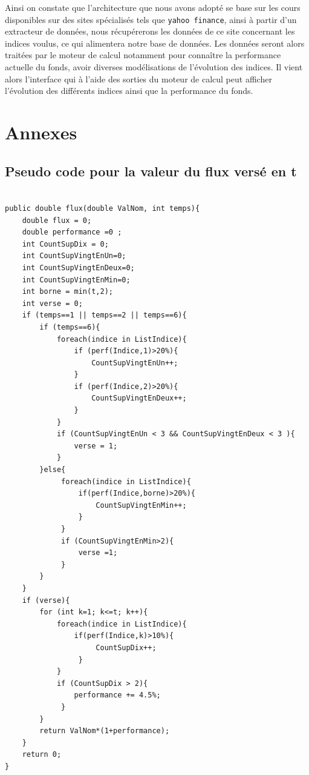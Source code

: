 \documentclass[french,12pt,a4paper]{article}
\begin{document}
\noindent Ainsi on constate que l'architecture que nous avons adopté se base sur les cours disponibles sur des sites spécialisés tels que \lstinline!yahoo finance!, ainsi à partir d'un extracteur de données, nous récupérerons les données de ce site concernant les indices voulus, ce qui alimentera notre base de données. Les données seront alors traitées par le moteur de calcul notamment pour connaître la performance actuelle du fonds, avoir diverses modélisations de l'évolution des indices. Il vient alors l'interface qui à l'aide des sorties du moteur de calcul peut afficher l'évolution des différents indices ainsi que la performance du fonds.


\section{Annexes}

\subsection{Pseudo code pour la valeur du flux versé en t}


\begin{lstlisting}

public double flux(double ValNom, int temps){
	double flux = 0;
	double performance =0 ;
	int CountSupDix = 0;
	int CountSupVingtEnUn=0;
	int CountSupVingtEnDeux=0;
	int CountSupVingtEnMin=0;
	int borne = min(t,2);
	int verse = 0;
	if (temps==1 || temps==2 || temps==6){
		if (temps==6){
	 		foreach(indice in ListIndice){
				if (perf(Indice,1)>20%){
					CountSupVingtEnUn++;
				}
				if (perf(Indice,2)>20%){
					CountSupVingtEnDeux++;
				}
			}
			if (CountSupVingtEnUn < 3 && CountSupVingtEnDeux < 3 ){
				verse = 1;
			}
		}else{
			 foreach(indice in ListIndice){
				 if(perf(Indice,borne)>20%){
					 CountSupVingtEnMin++;
				 }
			 }
			 if (CountSupVingtEnMin>2){
				 verse =1;
			 }
		}
	}
	if (verse){
		for (int k=1; k<=t; k++){
			foreach(indice in ListIndice){
				if(perf(Indice,k)>10%){
					 CountSupDix++;
				 }
			}
			if (CountSupDix > 2){
				performance += 4.5%;
			 }
		}
		return ValNom*(1+performance);
	}
	return 0;
}
\end{lstlisting}
\end{document}
